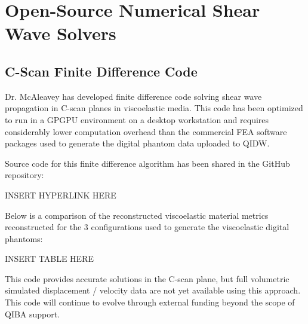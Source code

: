 \section{Open-Source Numerical Shear Wave Solvers}\label{sect:open_source}



\subsection{C-Scan Finite Difference Code}
Dr. McAleavey has developed finite difference code solving shear wave
propagation in C-scan planes in viscoelastic media.  This code has been
optimized to run in a GPGPU environment on a desktop workstation and requires
considerably lower computation overhead than the commercial FEA software
packages used to generate the digital phantom data uploaded to QIDW.

Source code for this finite difference algorithm has been shared in the GitHub
repository:

INSERT HYPERLINK HERE

Below is a comparison of the reconstructed viscoelastic material metrics
reconstructed for the 3 configurations used to generate the viscoelastic
digital phantoms:

INSERT TABLE HERE

This code provides accurate solutions in the C-scan plane, but full volumetric
simulated displacement / velocity data are not yet available using this
approach.  This code will continue to evolve through external funding beyond
the scope of QIBA support.
